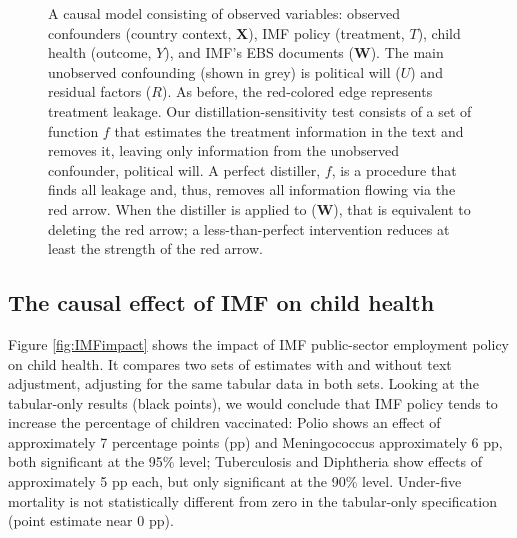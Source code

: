 \documentclass[11pt]{article}
\newcommand{\bX}{\bm{X}} %
\newcommand{\bW}{\bm{W}}  %
\begin{document}
\begin{figure}[htb]
    \begin{center}
\end{center}
\caption{A causal model consisting of observed variables: observed confounders (country context, $\bX$), IMF policy (treatment, $T$), child health (outcome, $Y$), and  IMF's EBS documents ($\bW$). The main unobserved confounding (shown in grey) is political will ($U$) and residual factors ($R$). As before, the red-colored edge represents treatment leakage. Our distillation-sensitivity test consists of a set of function $f$ that estimates the treatment information in the text and removes it, leaving only information from the unobserved confounder, political will. A perfect distiller, $f$, is a procedure that finds all leakage and, thus, removes all information flowing via the red arrow. When the distiller is applied to ($\bW$), that is equivalent to deleting the red arrow; a less-than-perfect intervention reduces at least the strength of the red arrow. \label{fig:IMFcausalmodel}}
\end{figure}

\subsection{The causal effect of IMF on child health}

Figure \ref{fig:IMFimpact} shows the impact of IMF public-sector employment policy on child health. It compares two sets of estimates with and without text adjustment, adjusting for the same tabular data in both sets. Looking at the tabular-only results (black points), we would conclude that IMF policy tends to increase the percentage of children vaccinated: Polio shows an effect of approximately 7 percentage points (pp) and Meningococcus approximately 6 pp, both significant at the 95\% level; Tuberculosis and Diphtheria show effects of approximately 5 pp each, but only significant at the 90\% level. Under-five mortality is not statistically different from zero in the tabular-only specification (point estimate near 0 pp).
\end{document}
